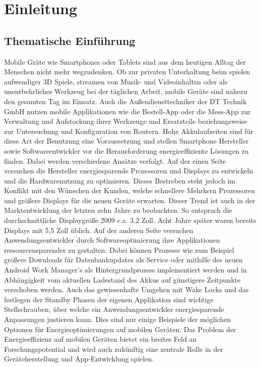 \chapter{Einleitung}
\section{Thematische Einführung}
Mobile Gräte wie Smartphones oder Tablets sind aus dem heutigen Alltag der Menschen nicht mehr wegzudenken. Ob zur privaten Unterhaltung beim spielen aufwendiger 3D Spiele, streamen von Musik- und Videoinhalten oder als unentbehrliches Werkzeug bei der täglichen Arbeit, mobile Geräte sind nahezu den gesamten Tag im Einsatz. Auch die Außendiensttechniker der DT Technik GmbH nutzen mobile Applikationen wie die Bestell-App oder die Mess-App zur Verwaltung und Aufstockung ihrer Werkzeuge und Ersatzteile beziehungsweise zur Untersuchung und Konfiguration von Routern. Hohe Akkulaufzeiten sind für diese Art der Benutzung eine Voraussetzung und stellen Smartphone Hersteller sowie Softwareentwickler vor die Herausforderung energieeffiziente Lösungen zu finden.
Dabei werden verschiedene Ansätze verfolgt. Auf der einen Seite versuchen die Hersteller energiesparende Prozessoren und Displays zu entwickeln und die Hardwarenutzung zu optimieren. Dieses Bestreben steht jedoch im Konflikt mit den Wünschen der Kunden, welche schnellere Mehrkern Prozessoren und größere Displays für die neuen Geräte erwarten. Dieser Trend ist auch in der Marktentwicklung der letzten zehn Jahre zu beobachten. So entsprach die durchschnittliche Displaygröße 2009 c.a. 3,2 Zoll. Acht Jahre später waren bereits Displays mit 5,5 Zoll üblich. Auf der anderen Seite versuchen Anwendungsentwickler durch Softwareoptimierung ihre Applikationen ressourcensparender zu gestalten. Dabei können Prozesse wie zum Beispiel größere Downloads für Datenbankupdates als Service oder mithilfe des neuen Android Work Manager's als Hintergrundprozess implementiert werden und in Abhängigkeit vom aktuellen Ladestand des Akkus auf günstigere Zeitpunkte verschoben werden. Auch das gewissenhafte Umgehen mit Wake Locks und das festlegen der Standby Phasen der eigenen Applikation sind wichtige Stellschrauben, über welche ein Anwendungsentwickler energiesparende Anpassungen justieren kann. Dies sind nur einige Beispiele  der möglichen Optionen für Energieoptimierungen auf mobilen Geräten. Das Problem der Energieeffizienz auf mobilen Geräten bietet ein breites Feld an Forschungspotential und wird auch zukünftig eine zentrale Rolle in der Geräteherstellung und App-Entwicklung spielen.

